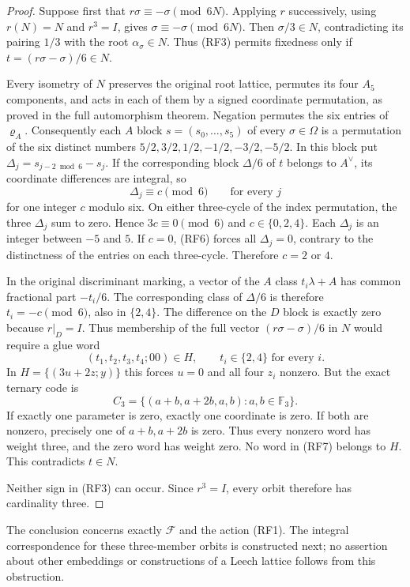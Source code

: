 \begin{proof}
Suppose first that $r\sigma\equiv-\sigma\pmod{6N}$.
Applying $r$ successively, using $r(N)=N$ and $r^3=I$, gives
$\sigma\equiv-\sigma\pmod{6N}$.
Then $\sigma/3\in N$, contradicting its pairing
$1/3$ with the root $\alpha_\sigma\in N$.
Thus (RF3) permits fixedness only if
$t=(r\sigma-\sigma)/6\in N$.

Every isometry of $N$ preserves the original root lattice, permutes
its four $A_5$ components, and acts in each of them by a signed
coordinate permutation, as proved in the full automorphism theorem.
Negation permutes the six entries of $\varrho_A$.
Consequently each $A$ block $s=(s_0,\ldots,s_5)$ of every
$\sigma\in\Omega$ is a permutation of the six distinct numbers
$5/2,3/2,1/2,-1/2,-3/2,-5/2$.
In this block put $\Delta_j=s_{j-2\bmod6}-s_j$.
If the corresponding block $\Delta/6$ of $t$ belongs to $A^\vee$,
its coordinate differences are integral, so
\[
 \Delta_j\equiv c\pmod6\qquad\text{for every }j
 \tag{RF6}
\]
for one integer $c$ modulo six.
On either three-cycle of the index permutation, the three
$\Delta_j$ sum to zero. Hence $3c\equiv0\pmod6$ and
$c\in\{0,2,4\}$.
Each $\Delta_j$ is an integer between $-5$ and $5$.
If $c=0$, (RF6) forces all $\Delta_j=0$, contrary to the
distinctness of the entries on each three-cycle.
Therefore $c=2$ or $4$.

In the original discriminant marking, a vector of the $A$ class
$t_i\lambda+A$ has common fractional part $-t_i/6$.
The corresponding class of $\Delta/6$ is therefore
$t_i=-c\pmod6$, also in $\{2,4\}$.
The difference on the $D$ block is exactly zero because $r|_D=I$.
Thus membership of the full vector $(r\sigma-\sigma)/6$ in $N$
would require a glue word
\[
 (t_1,t_2,t_3,t_4;00)\in H,\qquad t_i\in\{2,4\}
                                                \text{ for every }i.
 \tag{RF7}
\]
In $H=\{(3u+2z;y)\}$ this forces $u=0$ and all four $z_i$
nonzero. But the exact ternary code is
\[
 C_3=\{(a+b,a+2b,a,b):a,b\in\mathbb F_3\}.
 \tag{RF8}
\]
If exactly one parameter is zero, exactly one coordinate is zero.
If both are nonzero, precisely one of $a+b,a+2b$ is zero.
Thus every nonzero word has weight three, and the zero word
has weight zero. No word in (RF7) belongs to $H$.
This contradicts $t\in N$.

Neither sign in (RF3) can occur. Since $r^3=I$, every orbit
therefore has cardinality three.
\end{proof}

The conclusion concerns exactly $\mathscr F$ and the action (RF1).
The integral correspondence for these three-member orbits is
constructed next; no assertion about other embeddings or
constructions of a Leech lattice follows from this obstruction.

